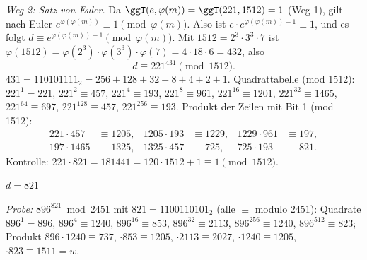 \emph{Weg 2: Satz von Euler.} Da $\ggT(e, \varphi(m)) = \ggT(221, 1512) = 1$ (Weg 1), gilt nach Euler $e^{\varphi(\varphi(m))} \equiv 1 \pmod{\varphi(m)}$. Also ist $e \cdot e^{\varphi(\varphi(m)) - 1} \equiv 1$, und es folgt
$d \equiv e^{\varphi(\varphi(m)) - 1} \pmod{\varphi(m)}$.
Mit $1512 = 2^3 \cdot 3^3 \cdot 7$ ist $\varphi(1512) = \varphi(2^3) \cdot \varphi(3^3) \cdot \varphi(7) = 4 \cdot 18 \cdot 6 = 432$, also
\[
d \equiv 221^{431} \pmod{1512}.
\]
$431 = 110101111_2 = 256 + 128 + 32 + 8 + 4 + 2 + 1$. Quadrattabelle (mod 1512):
$221^{1} = 221$, $221^{2} \equiv 457$, $221^{4} \equiv 193$, $221^{8} \equiv 961$, $221^{16} \equiv 1201$,
$221^{32} \equiv 1465$, $221^{64} \equiv 697$, $221^{128} \equiv 457$, $221^{256} \equiv 193$.
Produkt der Zeilen mit Bit 1 (mod 1512):
\begin{align*}
221 \cdot 457 &\equiv 1205, & 1205 \cdot 193 &\equiv 1229, & 1229 \cdot 961 &\equiv 197,\\
197 \cdot 1465 &\equiv 1325, & 1325 \cdot 457 &\equiv 725, & 725 \cdot 193 &\equiv 821 .
\end{align*}
Kontrolle: $221 \cdot 821 = 181441 = 120 \cdot 1512 + 1 \equiv 1 \pmod{1512}$.
\begin{ergebnis} $d = 821$ \end{ergebnis}

\emph{Probe:} $896^{821} \bmod 2451$ mit $821 = 1100110101_2$ (alle $\equiv$ modulo $2451$):
Quadrate $896^{1} = 896$, $896^{4} \equiv 1240$, $896^{16} \equiv 853$, $896^{32} \equiv 2113$, $896^{256} \equiv 1240$, $896^{512} \equiv 823$;
Produkt $896 \cdot 1240 \equiv 737$, $\cdot 853 \equiv 1205$, $\cdot 2113 \equiv 2027$, $\cdot 1240 \equiv 1205$, $\cdot 823 \equiv 1511 = w$. \checkmark

